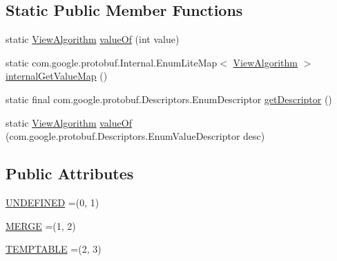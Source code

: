 \subsection*{Static Public Member Functions}
\begin{DoxyCompactItemize}
\item 
static \mbox{\hyperlink{enumcom_1_1mysql_1_1cj_1_1x_1_1protobuf_1_1_mysqlx_crud_1_1_view_algorithm}{View\+Algorithm}} \mbox{\hyperlink{enumcom_1_1mysql_1_1cj_1_1x_1_1protobuf_1_1_mysqlx_crud_1_1_view_algorithm_ab1795006b603890529a4d01d518c20bc}{value\+Of}} (int value)
\item 
static com.\+google.\+protobuf.\+Internal.\+Enum\+Lite\+Map$<$ \mbox{\hyperlink{enumcom_1_1mysql_1_1cj_1_1x_1_1protobuf_1_1_mysqlx_crud_1_1_view_algorithm}{View\+Algorithm}} $>$ \mbox{\hyperlink{enumcom_1_1mysql_1_1cj_1_1x_1_1protobuf_1_1_mysqlx_crud_1_1_view_algorithm_a8d9fe19135fa33610fb35f515b97625d}{internal\+Get\+Value\+Map}} ()
\item 
static final com.\+google.\+protobuf.\+Descriptors.\+Enum\+Descriptor \mbox{\hyperlink{enumcom_1_1mysql_1_1cj_1_1x_1_1protobuf_1_1_mysqlx_crud_1_1_view_algorithm_ac9a20c67de035b5d3c8169080c5115ea}{get\+Descriptor}} ()
\item 
static \mbox{\hyperlink{enumcom_1_1mysql_1_1cj_1_1x_1_1protobuf_1_1_mysqlx_crud_1_1_view_algorithm}{View\+Algorithm}} \mbox{\hyperlink{enumcom_1_1mysql_1_1cj_1_1x_1_1protobuf_1_1_mysqlx_crud_1_1_view_algorithm_aa9d214e7f8a1f82928ec69c9c50038b8}{value\+Of}} (com.\+google.\+protobuf.\+Descriptors.\+Enum\+Value\+Descriptor desc)
\end{DoxyCompactItemize}
\subsection*{Public Attributes}
\begin{DoxyCompactItemize}
\item 
\mbox{\hyperlink{enumcom_1_1mysql_1_1cj_1_1x_1_1protobuf_1_1_mysqlx_crud_1_1_view_algorithm_a70fb3167cb44c1401adaff0d980c3d82}{U\+N\+D\+E\+F\+I\+N\+ED}} =(0, 1)
\item 
\mbox{\hyperlink{enumcom_1_1mysql_1_1cj_1_1x_1_1protobuf_1_1_mysqlx_crud_1_1_view_algorithm_a907c96cff62b15728e6a78d9493e5bdb}{M\+E\+R\+GE}} =(1, 2)
\item 
\mbox{\hyperlink{enumcom_1_1mysql_1_1cj_1_1x_1_1protobuf_1_1_mysqlx_crud_1_1_view_algorithm_a4b9642108ad6345842ac84139a9e9183}{T\+E\+M\+P\+T\+A\+B\+LE}} =(2, 3)
\end{DoxyCompactItemize}
